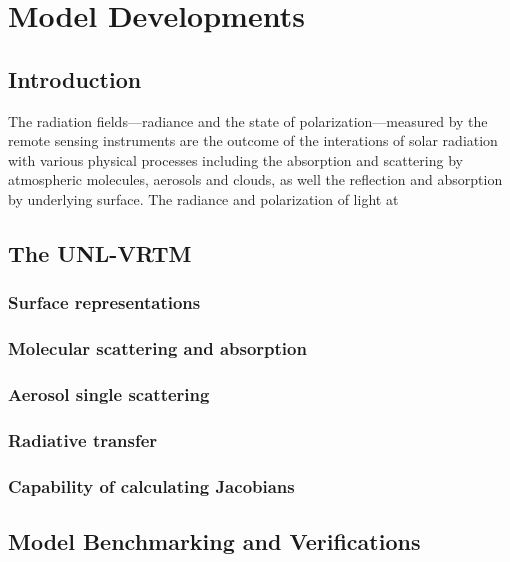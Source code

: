 \chapter{Model Developments}

\section{Introduction}

The radiation fields---radiance and the state of polarization---measured by the
remote sensing instruments are the outcome of the interations of solar
radiation with various physical processes including the absorption and
scattering by atmospheric molecules, aerosols and clouds, as well the
reflection and absorption by underlying surface. The radiance and polarization
of light at 

\section{The UNL-VRTM}

\subsection{Surface representations}

\subsection{Molecular scattering and absorption}

\subsection{Aerosol single scattering}

\subsection{Radiative transfer}

\subsection{Capability of calculating Jacobians}

\section{Model Benchmarking and Verifications}
